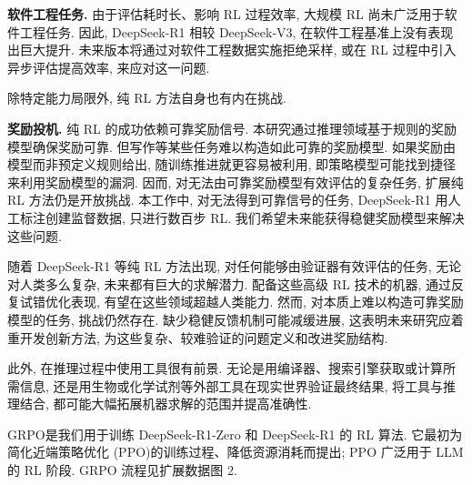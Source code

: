 \noindent\textbf{软件工程任务.} 由于评估耗时长、影响 RL 过程效率, 大规模 RL 尚未广泛用于软件工程任务. 因此, DeepSeek-R1 相较 DeepSeek-V3, 在软件工程基准上没有表现出巨大提升. 未来版本将通过对软件工程数据实施拒绝采样, 或在 RL 过程中引入异步评估提高效率, 来应对这一问题.

除特定能力局限外, 纯 RL 方法自身也有内在挑战.

\noindent\textbf{奖励投机.} 纯 RL 的成功依赖可靠奖励信号. 本研究通过推理领域基于规则的奖励模型确保奖励可靠. 但写作等某些任务难以构造如此可靠的奖励模型. 如果奖励由模型而非预定义规则给出, 随训练推进就更容易被利用, 即策略模型可能找到捷径来利用奖励模型的漏洞. 因而, 对无法由可靠奖励模型有效评估的复杂任务, 扩展纯 RL 方法仍是开放挑战. 本工作中, 对无法得到可靠信号的任务, DeepSeek-R1 用人工标注创建监督数据, 只进行数百步 RL. 我们希望未来能获得稳健奖励模型来解决这些问题.

随着 DeepSeek-R1 等纯 RL 方法出现, 对任何能够由验证器有效评估的任务, 无论对人类多么复杂, 未来都有巨大的求解潜力. 配备这些高级 RL 技术的机器, 通过反复试错优化表现, 有望在这些领域超越人类能力. 然而, 对本质上难以构造可靠奖励模型的任务, 挑战仍然存在. 缺少稳健反馈机制可能减缓进展, 这表明未来研究应着重开发创新方法, 为这些复杂、较难验证的问题定义和改进奖励结构.

此外, 在推理过程中使用工具很有前景. 无论是用编译器、搜索引擎获取或计算所需信息, 还是用生物或化学试剂等外部工具在现实世界验证最终结果, 将工具与推理结合, 都可能大幅拓展机器求解的范围并提高准确性.

\label{r1n-methods-grpo}
GRPO\cite{r1n-ref9}是我们用于训练 DeepSeek-R1-Zero 和 DeepSeek-R1 的 RL 算法. 它最初为简化近端策略优化 (PPO)\cite{r1n-ref31}的训练过程、降低资源消耗而提出; PPO 广泛用于 LLM 的 RL 阶段\cite{r1n-ref32}. GRPO 流程见扩展数据图 2.

